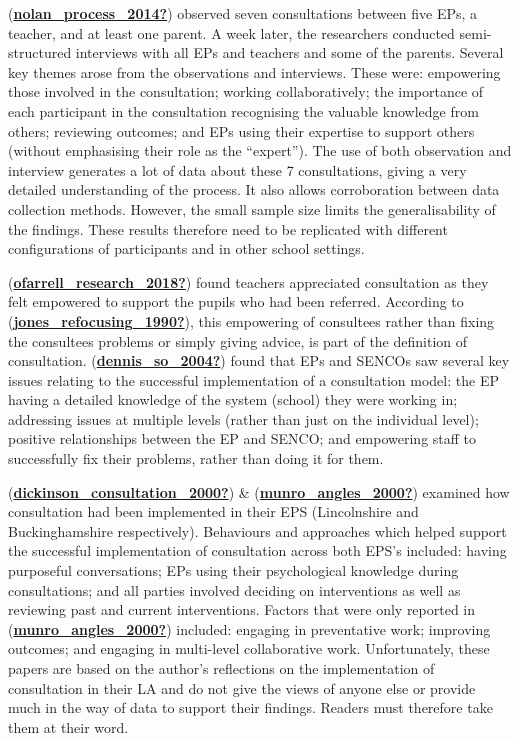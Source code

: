 \documentclass[
]{article}
\begin{document}
(\protect\hyperlink{ref-nolan_process_2014}{\textbf{nolan\_process\_2014?}})
observed seven consultations between five EPs, a teacher, and at least
one parent. A week later, the researchers conducted semi-structured
interviews with all EPs and teachers and some of the parents. Several
key themes arose from the observations and interviews. These were:
empowering those involved in the consultation; working collaboratively;
the importance of each participant in the consultation recognising the
valuable knowledge from others; reviewing outcomes; and EPs using their
expertise to support others (without emphasising their role as the
``expert''). The use of both observation and interview generates a lot
of data about these 7 consultations, giving a very detailed
understanding of the process. It also allows corroboration between data
collection methods. However, the small sample size limits the
generalisability of the findings. These results therefore need to be
replicated with different configurations of participants and in other
school settings.

(\protect\hyperlink{ref-ofarrell_research_2018}{\textbf{ofarrell\_research\_2018?}})
found teachers appreciated consultation as they felt empowered to
support the pupils who had been referred. According to
(\protect\hyperlink{ref-jones_refocusing_1990}{\textbf{jones\_refocusing\_1990?}}),
this empowering of consultees rather than fixing the consultees problems
or simply giving advice, is part of the definition of consultation.
(\protect\hyperlink{ref-dennis_so_2004}{\textbf{dennis\_so\_2004?}})
found that EPs and SENCOs saw several key issues relating to the
successful implementation of a consultation model: the EP having a
detailed knowledge of the system (school) they were working in;
addressing issues at multiple levels (rather than just on the individual
level); positive relationships between the EP and SENCO; and empowering
staff to successfully fix their problems, rather than doing it for them.

(\protect\hyperlink{ref-dickinson_consultation_2000}{\textbf{dickinson\_consultation\_2000?}})
\&
(\protect\hyperlink{ref-munro_angles_2000}{\textbf{munro\_angles\_2000?}})
examined how consultation had been implemented in their EPS
(Lincolnshire and Buckinghamshire respectively). Behaviours and
approaches which helped support the successful implementation of
consultation across both EPS's included: having purposeful
conversations; EPs using their psychological knowledge during
consultations; and all parties involved deciding on interventions as
well as reviewing past and current interventions. Factors that were only
reported in
(\protect\hyperlink{ref-munro_angles_2000}{\textbf{munro\_angles\_2000?}})
included: engaging in preventative work; improving outcomes; and
engaging in multi-level collaborative work. Unfortunately, these papers
are based on the author's reflections on the implementation of
consultation in their LA and do not give the views of anyone else or
provide much in the way of data to support their findings. Readers must
therefore take them at their word.
\end{document}

